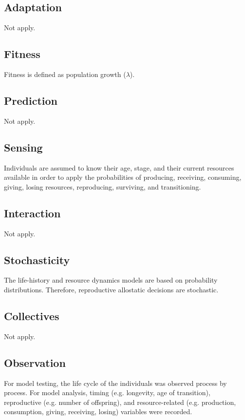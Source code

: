 \documentclass{article}
\begin{document}
\subsection{Adaptation}

Not apply.

\subsection{Fitness}

Fitness is defined as population growth ($\lambda$).

\subsection{Prediction}

Not apply.

\subsection{Sensing}

Individuals are assumed to know their age, stage, and their current resources available  in order to apply the probabilities of producing, receiving, consuming, giving, losing resources, reproducing, surviving, and transitioning.

\subsection{Interaction}

Not apply.

\subsection{Stochasticity}

The life-history and resource dynamics models are based on probability distributions. Therefore, reproductive allostatic decisions are stochastic.

\subsection{Collectives}

Not apply.

\subsection{Observation}

For model testing, the life cycle of the individuals was observed process by process. For model analysis, timing (e.g. longevity, age of transition), reproductive (e.g. number of offspring), and resource-related (e.g. production, consumption, giving, receiving, losing) variables were recorded.
\end{document}
